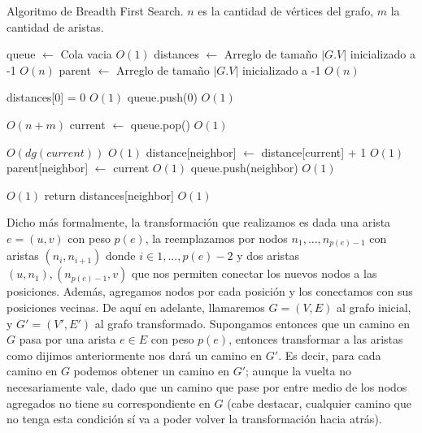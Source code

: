 \documentclass{article}
\theoremstyle{definition}
\theoremstyle{remark}
\begin{document}
\begin{algorithm}[h!]
\caption{Algoritmo de Breadth First Search. $n$ es la cantidad de vértices del grafo, $m$ la cantidad de aristas. \label{alg:bfs}}

\begin{algorithmic}[h!]
\State queue $\gets$ Cola vacia \Comment $O(1)$
\State distances $\gets$ Arreglo de tamaño $|G.V|$ inicializado a -1 \Comment $O(n)$
\State parent $\gets$ Arreglo de tamaño $|G.V|$ inicializado a -1 \Comment $O(n)$

\State distances[0] = 0 \Comment $O(1)$
\State queue.push(0) \Comment $O(1)$

 \Comment $O(n + m)$
    \State current $\gets$ queue.pop() \Comment $O(1)$
    
     \Comment $O(dg(current))$
         \Comment $O(1)$
            \State distance[neighbor] $\gets$ distance[current] + 1 \Comment $O(1)$
            \State parent[neighbor] $\gets$ current \Comment $O(1)$
            \State queue.push(neighbor) \Comment $O(1)$
        \EndIf
        
         \Comment $O(1)$
            \State return distances[neighbor] \Comment $O(1)$
        \EndIf
    \EndFor
\EndWhile
\EndProcedure
\end{algorithmic}
\end{algorithm}

Dicho más formalmente, la transformación que realizamos es dada una arista $e = (u, v)$ con peso $p(e)$, la reemplazamos por nodos $n_1, ..., n_{p(e)-1}$ con aristas $(n_i, n_{i+1})$ donde $i \in {1, ..., p(e) - 2}$ y dos aristas $(u, n_1), (n_{p(e)-1}, v)$ que nos permiten conectar los nuevos nodos a las posiciones. Además, agregamos nodos por cada posición y los conectamos con sus posiciones vecinas. De aquí en adelante, llamaremos $G = (V, E)$ al grafo inicial, y $G' = (V', E')$ al grafo transformado. Supongamos entonces que un camino en $G$ pasa por una arista $e \in E$ con peso $p(e)$, entonces transformar a las aristas como dijimos anteriormente nos dará un camino en $G'$. Es decir, para cada camino en $G$ podemos obtener un camino en $G'$; aunque la vuelta no necesariamente vale, dado que un camino que pase por entre medio de los nodos agregados no tiene su correspondiente en $G$ (cabe destacar, cualquier camino que no tenga esta condición sí va a poder volver la transformación hacia atrás).
\end{document}
